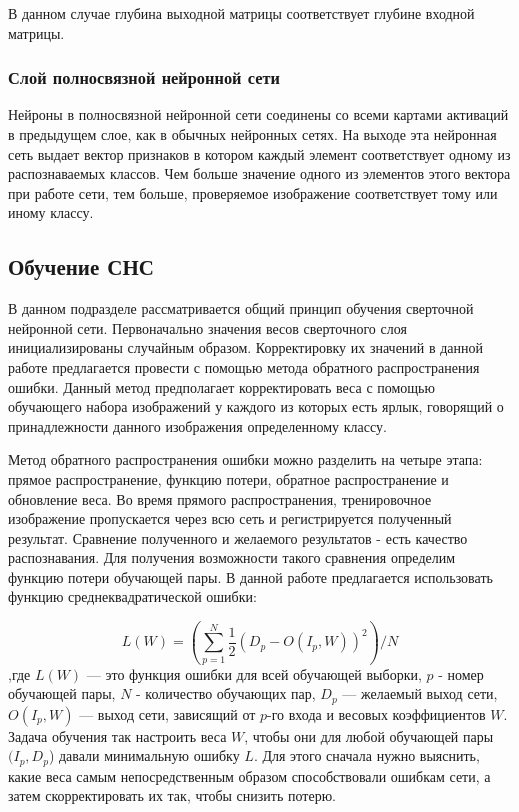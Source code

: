 \documentclass[14pt]{article}
\numberwithin{figure}{section}
\numberwithin{equation}{section}
\begin{document}
В данном случае глубина выходной матрицы соответствует глубине входной матрицы.

\subsubsection{Слой полносвязной нейронной сети}

Нейроны в полносвязной нейронной сети соединены со всеми картами активаций в предыдущем слое, как в обычных нейронных сетях. На выходе эта нейронная сеть выдает вектор признаков в котором каждый элемент соответствует одному из распознаваемых классов. Чем больше значение одного из элементов этого вектора при работе сети, тем больше, проверяемое изображение соответствует тому или иному классу.

\newpage

\subsection{Обучение СНС}

В данном подразделе рассматривается общий принцип обучения сверточной нейронной сети. Первоначально значения весов сверточного слоя инициализированы случайным образом. Корректировку их значений в данной работе предлагается провести с помощью метода обратного распространения ошибки\cite{MNBackProb}. Данный метод предполагает корректировать веса с помощью обучающего набора изображений у каждого из которых есть ярлык, говорящий о принадлежности данного изображения определенному классу.

Метод обратного распространения ошибки можно разделить на четыре этапа: прямое распространение, функцию потери, обратное распространение и обновление веса. Во время прямого распространения, тренировочное изображение пропускается через всю сеть и регистрируется полученный результат. Сравнение полученного и желаемого результатов - есть качество распознавания. Для получения возможности такого сравнения определим функцию потери обучающей пары. В данной работе предлагается использовать функцию среднеквадратической ошибки:

\begin{equation}
    L(W) = (\sum\limits_{p = 1}^{N} \frac{1}{2}(D_p - O(I_p, W))^2) / N
\end{equation}
,где $L(W)$ — это функция ошибки для всей обучающей выборки, $p$ - номер обучающей пары, $N$ - количество обучающих пар, $D_p$ — желаемый выход сети, $O(I_p,W)$ — выход сети, зависящий от $p$-го входа и весовых коэффициентов $W$. Задача обучения так настроить веса $W$, чтобы они для любой обучающей пары $(I_p,D_p$) давали минимальную ошибку $L$. Для этого сначала нужно выяснить, какие веса самым непосредственным образом способствовали ошибкам сети, а затем скорректировать их так, чтобы снизить потерю.
\end{document}
